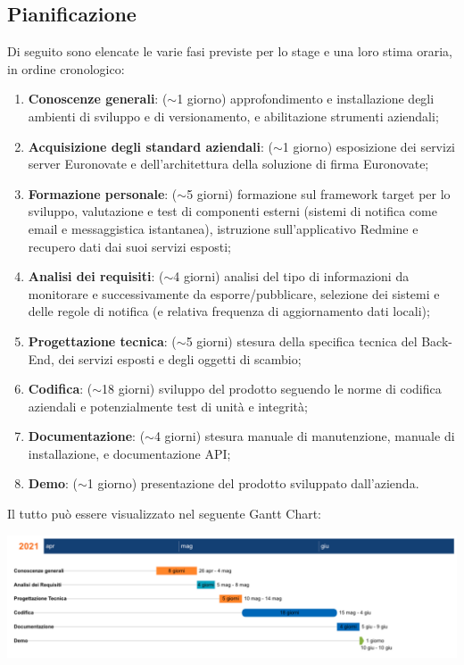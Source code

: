 \subsection{Pianificazione}
	Di seguito sono elencate le varie fasi previste per lo stage e una loro stima oraria, in ordine cronologico:
	\begin{enumerate}
		\item \textbf{Conoscenze generali}: ($\sim$1 giorno) approfondimento e installazione degli ambienti di sviluppo e di versionamento, e abilitazione strumenti aziendali;
		\item \textbf{Acquisizione degli standard aziendali}: ($\sim$1 giorno) esposizione dei servizi server Euronovate e dell'architettura della soluzione di firma Euronovate;
		\item \textbf{Formazione personale}: ($\sim$5 giorni) formazione sul framework target per lo sviluppo, valutazione e test di componenti esterni (sistemi di notifica come email e messaggistica istantanea), istruzione sull'applicativo Redmine e recupero dati dai suoi servizi esposti;
		\item \textbf{Analisi dei requisiti}: ($\sim$4 giorni) analisi del tipo di informazioni da monitorare e successivamente da esporre/pubblicare, selezione dei sistemi e delle regole di notifica (e relativa frequenza di aggiornamento dati locali);
		\item \textbf{Progettazione tecnica}: ($\sim$5 giorni) stesura della specifica tecnica del Back-End, dei servizi esposti e degli oggetti di scambio;
		\item \textbf{Codifica}: ($\sim$18 giorni) sviluppo del prodotto seguendo le norme di codifica aziendali e potenzialmente test di unità e integrità;
		\item \textbf{Documentazione}: ($\sim$4 giorni) stesura manuale di manutenzione, manuale di installazione, e documentazione API;
		\item \textbf{Demo}: ($\sim$1 giorno) presentazione del prodotto sviluppato dall'azienda. 
	\end{enumerate}
	Il tutto può essere visualizzato nel seguente Gantt Chart:
	\begin{center}
		\includegraphics[keepaspectratio = true, width=15cm]{immagini/pianificazione.png}
	\end{center}
\iffalse
